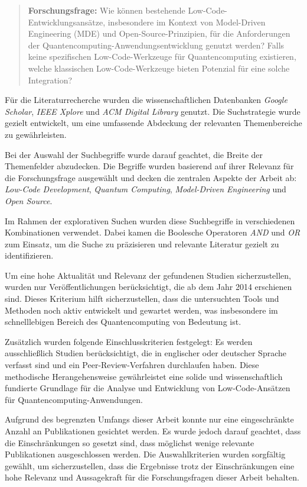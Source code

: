 \begin{quote}
    \textbf{Forschungsfrage:} Wie können bestehende Low-Code-Entwicklungsansätze, insbesondere im Kontext von 
    Model-Driven Engineering (MDE) und Open-Source-Prinzipien, für die Anforderungen der Quantencomputing-Anwendungsentwicklung 
    genutzt werden? Falls keine spezifischen Low-Code-Werkzeuge für Quantencomputing existieren, welche klassischen Low-Code-Werkzeuge 
    bieten Potenzial für eine solche Integration?
\label{research_question}
\end{quote}

Für die Literaturrecherche wurden die wissenschaftlichen Datenbanken \textit{Google Scholar}, \textit{IEEE Xplore} und 
\textit{ACM Digital Library} genutzt. Die Suchstrategie wurde gezielt entwickelt, um eine umfassende Abdeckung der relevanten 
Themenbereiche zu gewährleisten.

Bei der Auswahl der Suchbegriffe wurde darauf geachtet, die Breite der Themenfelder abzudecken. Die Begriffe wurden basierend 
auf ihrer Relevanz für die Forschungsfrage ausgewählt und decken die zentralen Aspekte der Arbeit ab:
\textit{Low-Code Development},
\textit{Quantum Computing},
\textit{Model-Driven Engineering} und
\textit{Open Source}.

Im Rahmen der explorativen Suchen wurden diese Suchbegriffe in verschiedenen Kombinationen verwendet. 
Dabei kamen die Boolesche Operatoren \textit{AND} und \textit{OR} zum Einsatz, um die Suche zu präzisieren 
und relevante Literatur gezielt zu identifizieren.

Um eine hohe Aktualität und Relevanz der gefundenen Studien sicherzustellen, wurden nur Veröffentlichungen berücksichtigt, 
die ab dem Jahr 2014 erschienen sind. Dieses Kriterium hilft sicherzustellen, dass die untersuchten Tools und Methoden noch 
aktiv entwickelt und gewartet werden, was insbesondere im schnelllebigen Bereich des Quantencomputing von Bedeutung ist.

Zusätzlich wurden folgende Einschlusskriterien festgelegt: Es werden ausschließlich Studien berücksichtigt, die in englischer 
oder deutscher Sprache verfasst sind und ein Peer-Review-Verfahren durchlaufen haben. Diese methodische Herangehensweise 
gewährleistet eine solide und wissenschaftlich fundierte Grundlage für die Analyse und Entwicklung von Low-Code-Ansätzen 
für Quantencomputing-Anwendungen.

Aufgrund des begrenzten Umfangs dieser Arbeit konnte nur eine eingeschränkte Anzahl an Publikationen gesichtet werden. 
Es wurde jedoch darauf geachtet, dass die Einschränkungen so gesetzt sind, dass möglichst wenige relevante Publikationen 
ausgeschlossen werden. Die Auswahlkriterien wurden sorgfältig gewählt, um sicherzustellen, dass die Ergebnisse trotz der 
Einschränkungen eine hohe Relevanz und Aussagekraft für die Forschungsfragen dieser Arbeit behalten.

